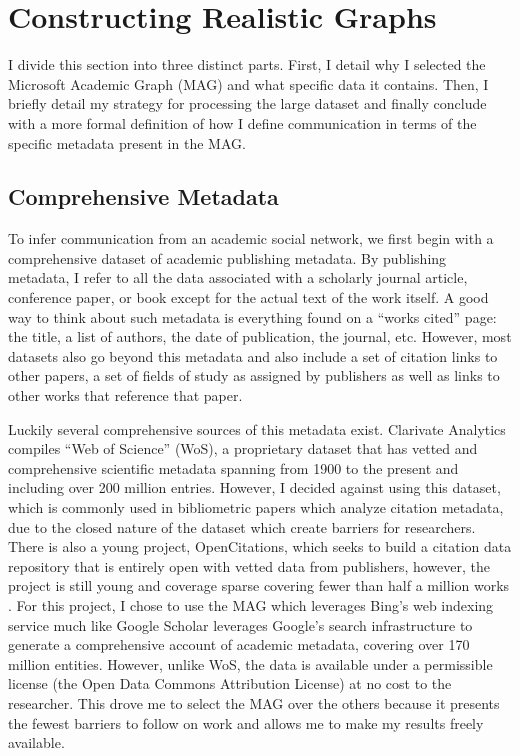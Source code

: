 \hypertarget{constructing-realistic-graphs}{%
\section{Constructing Realistic
Graphs}\label{constructing-realistic-graphs}}

I divide this section into three distinct parts. First, I detail why I
selected the Microsoft Academic Graph (MAG) and what specific data it
contains. Then, I briefly detail my strategy for processing the large
dataset and finally conclude with a more formal definition of how I
define communication in terms of the specific metadata present in the
MAG.

\hypertarget{comprehensive-metadata}{%
\subsection{Comprehensive Metadata}\label{comprehensive-metadata}}

To infer communication from an academic social network, we first begin
with a comprehensive dataset of academic publishing metadata. By
publishing metadata, I refer to all the data associated with a scholarly
journal article, conference paper, or book except for the actual text of
the work itself. A good way to think about such metadata is everything
found on a ``works cited'' page: the title, a list of authors, the date
of publication, the journal, etc. However, most datasets also go beyond
this metadata and also include a set of citation links to other papers,
a set of fields of study as assigned by publishers as well as links to
other works that reference that paper.

Luckily several comprehensive sources of this metadata exist. Clarivate
Analytics compiles ``Web of Science'' (WoS), a proprietary dataset that
has vetted and comprehensive scientific metadata spanning from 1900 to
the present and including over 200 million entries. However, I decided
against using this dataset, which is commonly used in bibliometric
papers which analyze citation metadata, due to the closed nature of the
dataset which create barriers for researchers. There is also a young
project, OpenCitations, which seeks to build a citation data repository
that is entirely open with vetted data from publishers, however, the
project is still young and coverage sparse covering fewer than half a
million works
\autocite{peroniOpenCitationsInfrastructureOrganization2020}. For this
project, I chose to use the MAG
\autocite{sinhaOverviewMicrosoftAcademic2015b,wangReviewMicrosoftAcademic2019}
which leverages Bing's web indexing service much like Google Scholar
leverages Google's search infrastructure to generate a comprehensive
account of academic metadata, covering over 170 million entities.
However, unlike WoS, the data is available under a permissible license
(the Open Data Commons Attribution License) at no cost to the
researcher. This drove me to select the MAG over the others because it
presents the fewest barriers to follow on work and allows me to make my
results freely available.


